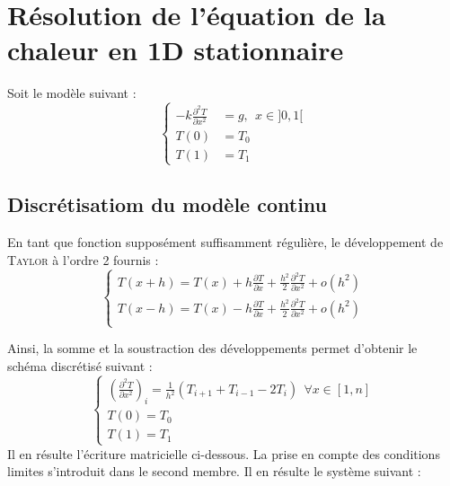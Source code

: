 \documentclass[12pt]{report}
\begin{document}
\section{Résolution de l'équation de la chaleur en 1D stationnaire}




Soit le modèle suivant : 
\begin{equation}
\left\{
\begin{array}{ll}
-k \frac{\partial^2 T }{\partial x^2 } &= g, ~~x \in ]0, 1[\\
T(0) &= T_0\\
T(1) &= T_1
\end{array}
\right.
\end{equation}

\subsection{Discrétisatiom du modèle continu}
En tant que fonction supposément suffisamment régulière, le développement de \textsc{Taylor} à l'ordre 2 fournis :
\begin{equation}
\left\{
\begin{array}{l}
T(x+h) = T(x) + h \frac{\partial T}{\partial x} + \frac{h^2}{2}\frac{\partial ^2 T}{\partial x^2} + o(h^2) \\ 
T(x-h) = T(x) - h \frac{\partial T}{\partial x} + \frac{h^2}{2}\frac{\partial ^2 T}{\partial x^2} + o(h^2) \\
\end{array}
\right.
\end{equation}

Ainsi, la somme et la soustraction des développements permet d'obtenir le schéma discrétisé suivant : 
\begin{equation}
\left\{
\begin{array}{l}
\left(\frac{\partial ^2 T}{\partial x^2}\right)_i = \frac{1}{h^2} \left( T_{i+1} + T_{i-1} - 2 T_i\right) ~~\forall x \in [1, n]\\
T(0) = T_0 \\
T(1) = T_1
\end{array}
\right.
\end{equation}
Il en résulte l'écriture matricielle ci-dessous. La prise en compte des conditions limites s'introduit dans le second membre.
Il en résulte le système suivant :
\end{document}
